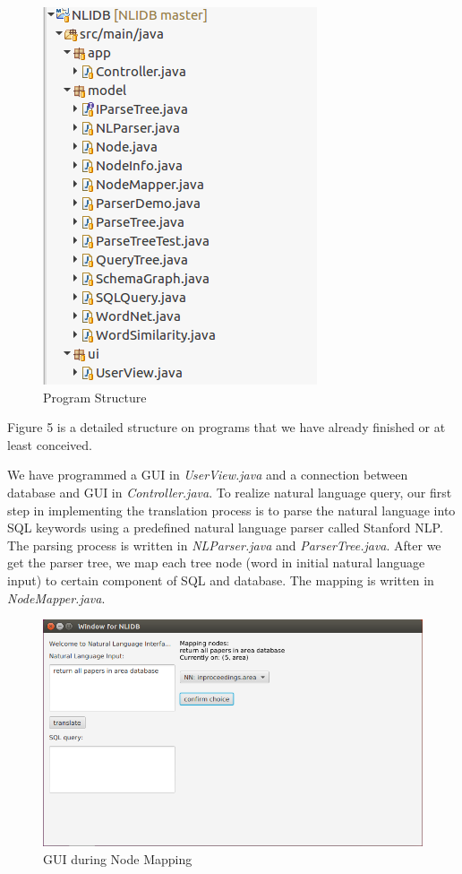 \documentclass[twocolumn]{article}
\begin{document}
\begin{figure}[ht]
	\centerline{\includegraphics[width=0.8\linewidth]{figures/program_structure.png}}
	\caption{Program Structure}
\end{figure}
Figure 5 is a detailed structure on programs that we have already finished or at least conceived.

We have programmed a GUI in \textit{UserView.java} and a connection between database and GUI in \textit{Controller.java}. To realize natural language query, our first step in implementing the translation process is to parse the natural language into SQL keywords using a predefined natural language parser called Stanford NLP. The parsing process is written in \textit{NLParser.java} and \textit{ParserTree.java}. After we get the parser tree, we map each tree node (word in initial natural language input) to certain component of SQL and database. The mapping is written in \textit{NodeMapper.java}.

\begin{figure}[ht]
	\centerline{\includegraphics[width=0.7\linewidth]{figures/gui_nodes_mapping.png}}
	\caption{GUI during Node Mapping}
\end{figure}
\end{document}
